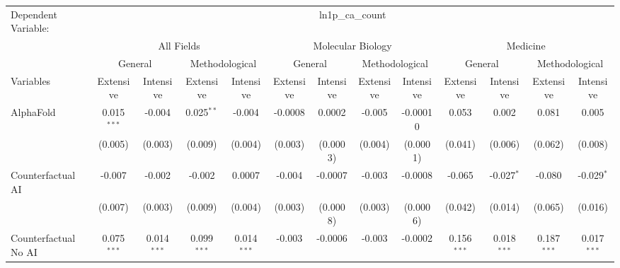 \begingroup
\centering
\begin{tabular}{lcccccccccccc}
   \tabularnewline \midrule \midrule
   Dependent Variable: & \multicolumn{12}{c}{ln1p\_ca\_count}\\
 & \multicolumn{4}{c}{All Fields} & \multicolumn{4}{c}{Molecular Biology} & \multicolumn{4}{c}{Medicine} \\
\cmidrule(lr){2-5} \cmidrule(lr){6-9} \cmidrule(lr){10-13}
 & \multicolumn{2}{c}{General} & \multicolumn{2}{c}{Methodological} & \multicolumn{2}{c}{General} & \multicolumn{2}{c}{Methodological} & \multicolumn{2}{c}{General} & \multicolumn{2}{c}{Methodological} \\
\cmidrule(lr){2-3} \cmidrule(lr){4-5} \cmidrule(lr){6-7} \cmidrule(lr){8-9} \cmidrule(lr){10-11} \cmidrule(lr){12-13}
Variables & \multicolumn{1}{c}{Extensive} & \multicolumn{1}{c}{Intensive} & \multicolumn{1}{c}{Extensive} & \multicolumn{1}{c}{Intensive} & \multicolumn{1}{c}{Extensive} & \multicolumn{1}{c}{Intensive} & \multicolumn{1}{c}{Extensive} & \multicolumn{1}{c}{Intensive} & \multicolumn{1}{c}{Extensive} & \multicolumn{1}{c}{Intensive} & \multicolumn{1}{c}{Extensive} & \multicolumn{1}{c}{Intensive} \\
\cmidrule(lr){1-1}\cmidrule(lr){2-2} \cmidrule(lr){3-3} \cmidrule(lr){4-4} \cmidrule(lr){5-5} \cmidrule(lr){6-6} \cmidrule(lr){7-7} \cmidrule(lr){8-8} \cmidrule(lr){9-9} \cmidrule(lr){10-10} \cmidrule(lr){11-11} \cmidrule(lr){12-12} \cmidrule(lr){13-13}
   AlphaFold                                & 0.015$^{***}$ & -0.004        & 0.025$^{**}$  & -0.004        & -0.0008 & 0.0002    & -0.005  & -0.00010  & 0.053         & 0.002         & 0.081         & 0.005\\   
                                            & (0.005)       & (0.003)       & (0.009)       & (0.004)       & (0.003) & (0.0003)  & (0.004) & (0.0001)  & (0.041)       & (0.006)       & (0.062)       & (0.008)\\   
   Counterfactual AI                        & -0.007        & -0.002        & -0.002        & 0.0007        & -0.004  & -0.0007   & -0.003  & -0.0008   & -0.065        & -0.027$^{*}$  & -0.080        & -0.029$^{*}$\\   
                                            & (0.007)       & (0.003)       & (0.009)       & (0.004)       & (0.003) & (0.0008)  & (0.003) & (0.0006)  & (0.042)       & (0.014)       & (0.065)       & (0.016)\\   
   Counterfactual No AI                     & 0.075$^{***}$ & 0.014$^{***}$ & 0.099$^{***}$ & 0.014$^{***}$ & -0.003  & -0.0006   & -0.003  & -0.0002   & 0.156$^{***}$ & 0.018$^{***}$ & 0.187$^{***}$ & 0.017$^{***}$\\   

\end{tabular}
